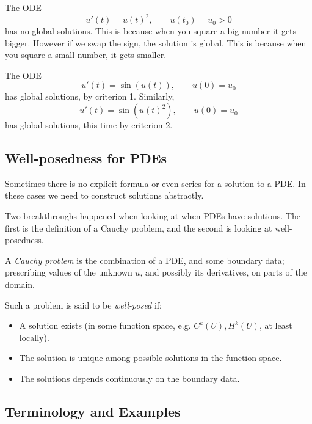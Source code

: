 \documentclass[12pt]{article}
\begin{document}
\begin{exbox}
	The ODE
	\[
	u'(t) = u(t)^2, \qquad u(t_0) = u_0 > 0
	\]
	has no global solutions. This is because when you square a big number it gets bigger. However if we swap the sign, the solution is global. This is because when you square a small number, it gets smaller.

	The ODE
	\[
	u'(t) = \sin(u(t)), \qquad u(0) = u_0
	\]
	has global solutions, by criterion 1. Similarly,
	\[
	u'(t) = \sin (u(t)^2), \qquad u(0) = u_0
	\]
	has global solutions, this time by criterion 2.
\end{exbox}

\subsection{Well-posedness for PDEs}%
\label{sub:well_posed}

Sometimes there is no explicit formula or even series for a solution to a PDE. In these cases we need to construct solutions abstractly.

Two breakthroughs happened when looking at when PDEs have solutions. The first is the definition of a Cauchy problem, and the second is looking at well-posedness.

\begin{definition}
	A \emph{Cauchy problem} is the combination of a PDE, and some boundary data; prescribing values of the unknown $u$, and possibly its derivatives, on parts of the domain.

	Such a problem is said to be \emph{well-posed} if:
	\begin{itemize}
		\item A solution exists (in some function space, e.g. $C^k(U), H^k(U)$, at least locally).
		\item The solution is unique among possible solutions in the function space.
		\item The solutions depends continuously on the boundary data.
	\end{itemize}
	
\end{definition}


\subsection{Terminology and Examples}%
\label{sub:termex}
\end{document}
